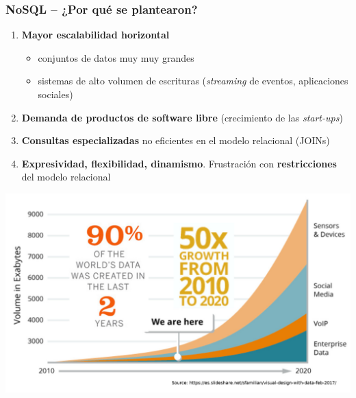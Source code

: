 \documentclass[14pt]{beamer}
\newcommand{\ra}{{\color{blue} $\Rightarrow${}~{}}}
\begin{document}
\begin{frame}[allowframebreaks]
  \frametitle{NoSQL -- ¿Por qué se plantearon?}
\begin{enumerate}
\item {\bf Mayor escalabilidad horizontal}
  \begin{itemize}
  \item conjuntos de datos muy muy grandes
  \item sistemas de alto volumen de escrituras ({\em streaming\/} de
    eventos, aplicaciones sociales)
  \end{itemize}
\item {\bf Demanda de productos de software libre} (crecimiento de las {\em
    start-ups})
\item {\bf Consultas especializadas} no eficientes en el modelo relacional
  (JOINs)
\item {\bf Expresividad, flexibilidad, dinamismo}. Frustración con {\bf
    restricciones} del modelo relacional
\end{enumerate}

\framebreak

\includegraphics[width=\textwidth]{img/data-growth}

\end{frame}
\end{document}
